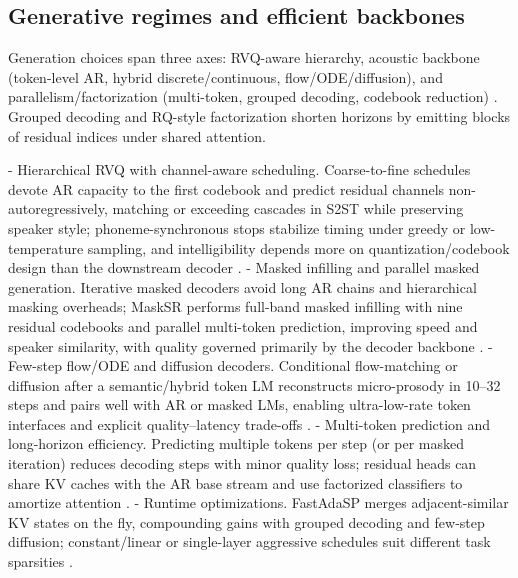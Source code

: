\documentclass{article}
\begin{document}
\subsection{Generative regimes and efficient backbones} \label{subsec:Generative regimes and efficient backbones}
Generation choices span three axes: RVQ-aware hierarchy, acoustic backbone (token-level AR, hybrid discrete/continuous, flow/ODE/diffusion), and parallelism/factorization (multi-token, grouped decoding, codebook reduction) \cite{ji2025languagecodecbridgingdiscreterepresentat,verma2024whispergpthybridrepresentationaudiolarge,li2024investigatingneuralaudiocodecsspeechlang,wang2024c3llmconditionalmultimodalcontentgenerat}. Grouped decoding and RQ-style factorization shorten horizons by emitting blocks of residual indices under shared attention.

- Hierarchical RVQ with channel-aware scheduling. Coarse-to-fine schedules devote AR capacity to the first codebook and predict residual channels non-autoregressively, matching or exceeding cascades in S2ST while preserving speaker style; phoneme-synchronous stops stabilize timing under greedy or low-temperature sampling, and intelligibility depends more on quantization/codebook design than the downstream decoder \cite{peng2024mslms2stmultitaskspeechlanguagemodeltext,song2024ellavstableneuralcodeclanguagemodelingal,li2024investigatingneuralaudiocodecsspeechlang}.
- Masked infilling and parallel masked generation. Iterative masked decoders avoid long AR chains and hierarchical masking overheads; MaskSR performs full-band masked infilling with nine residual codebooks and parallel multi-token prediction, improving speed and speaker similarity, with quality governed primarily by the decoder backbone \cite{li2024masksrmaskedlanguagemodelfullbandspeechr,li2024investigatingneuralaudiocodecsspeechlang}.
- Few-step flow/ODE and diffusion decoders. Conditional flow-matching or diffusion after a semantic/hybrid token LM reconstructs micro-prosody in 10--32 steps and pairs well with AR or masked LMs, enabling ultra-low-rate token interfaces and explicit quality--latency trade-offs \cite{wang2025tadicodectextawarediffusionspeechtokeniz,li2024investigatingneuralaudiocodecsspeechlang}.
- Multi-token prediction and long-horizon efficiency. Predicting multiple tokens per step (or per masked iteration) reduces decoding steps with minor quality loss; residual heads can share KV caches with the AR base stream and use factorized classifiers to amortize attention \cite{li2024masksrmaskedlanguagemodelfullbandspeechr}.
- Runtime optimizations. FastAdaSP merges adjacent-similar KV states on the fly, compounding gains with grouped decoding and few-step diffusion; constant/linear or single-layer aggressive schedules suit different task sparsities \cite{lu2024fastadaspmultitaskadaptedefficientinfere}.
\end{document}
